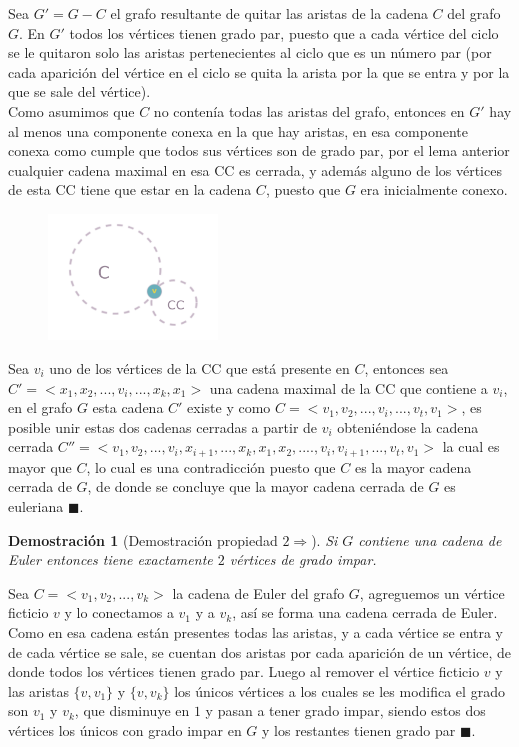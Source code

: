 \documentclass[a4paper,1pt]{report}
\newtheorem*{dem}{Demostración}
\begin{document}
Sea $G' = G -C$ el grafo resultante de quitar las aristas de la cadena $C$ del grafo $G$. En $G'$ todos los v\'ertices tienen grado par, puesto que a cada v\'ertice del ciclo se le quitaron solo las aristas pertenecientes al ciclo que es un n\'umero par (por cada aparici\'on del v\'ertice en el ciclo se quita la arista por la que se entra y por la que se sale del v\'ertice). \\

Como asumimos que $C$ no conten\'ia todas las aristas del grafo, entonces en $G'$ hay al menos una componente conexa en la que hay aristas, en esa componente conexa como cumple que todos sus v\'ertices son de grado par, por el lema anterior cualquier cadena maximal en esa CC es cerrada, y adem\'as alguno de los v\'ertices de esta CC tiene que estar en la cadena $C$, puesto que $G$ era inicialmente conexo. \\

\begin{figure}[H]
    \centering
    \includegraphics[width=0.4\textwidth]{figures3/Cadena+CC.png}
\end{figure}  

Sea $v_i$ uno de los v\'ertices de la CC que est\'a presente en $C$, entonces sea $C' = <x_1, x_2, ..., v_i, ..., x_k, x_1>$ una cadena maximal de la CC que contiene a $v_i$, en el grafo $G$ esta cadena $C'$ existe y como $C = <v_1, v_2,..., v_i, ..., v_t, v_1>$, es posible unir estas dos cadenas cerradas a partir de $v_i$ obteni\'endose la cadena cerrada $C'' = <v_1, v_2, ..., v_i, x_{i + 1}, ..., x_k, x_1, x_2, ...., v_i, v_{i+1}, ..., v_t, v_1>$ la cual es mayor que $C$, lo cual es una contradicci\'on puesto que $C$ es la mayor cadena cerrada de $G$, de donde se concluye que la mayor cadena cerrada de $G$ es euleriana $\blacksquare$.

\begin{dem}[Demostraci\'on propiedad $2 \Rightarrow$] Si $G$ contiene una cadena de Euler entonces tiene exactamente $2$ v\'ertices de grado impar.\end{dem}

Sea $C = <v_1, v_2,..., v_k>$ la cadena de Euler del grafo $G$, agreguemos un v\'ertice ficticio $v$ y lo conectamos a $v_1$ y a $v_k$, as\'i se forma una cadena cerrada de Euler. Como en esa cadena est\'an presentes todas las aristas, y a cada v\'ertice se entra y de cada v\'ertice se sale, se cuentan dos aristas por cada aparici\'on de un v\'ertice, de donde todos los v\'ertices tienen grado par. Luego al remover el v\'ertice ficticio $v$ y las aristas $\{v, v_1\}$ y $\{v, v_k\}$ los \'unicos v\'ertices a los cuales se les modifica el grado son $v_1$ y $v_k$, que disminuye en $1$ y pasan a tener grado impar, siendo estos dos v\'ertices los \'unicos con grado impar en $G$ y los restantes tienen grado par $\blacksquare$.
\end{document}
